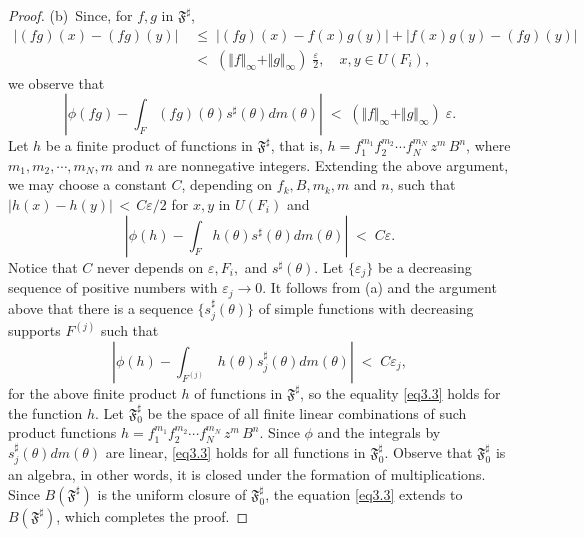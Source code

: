 \documentclass[12pt]{amsart}
\theoremstyle{plain}
\numberwithin{equation}{section}
\begin{document}
\begin{proof}
\medskip
\noindent
{\rm(b)}\, Since, for $f, g$ in $\mathfrak{F}^\sharp$,
\begin{align*}
\left \vert (fg)(x) - (fg)(y) \right \vert
\;&\le\;\left \vert (fg)(x) - f(x)g(y) \right \vert +
\left \vert f(x)g(y) - (fg)(y) \right \vert \\
\;&<\; (\Vert f \Vert_\infty+\Vert g \Vert_\infty )\;\frac{\varepsilon}{2},
\quad x,y \in U(F_i),
\end{align*}
we observe that
\begin{equation*}
\left \vert \phi(fg) -
\int_F (fg)(\theta)s^\sharp(\theta) dm(\theta) \right \vert
\;<\; (\Vert f \Vert_\infty+\Vert g \Vert_\infty )\;\varepsilon.
\end{equation*}
Let $h$ be a finite product of functions in $\mathfrak{F}^\sharp$,
that is, $h = f_1^{m_1} f_2^{m_2} \cdots f_N^{m_N}\, z^m \, B^n$,
where $m_1, m_2, \cdots, m_N, m$ and $n$ are nonnegative integers.
Extending the above argument, we may choose a constant $C$, depending
on $f_k, B, m_k, m$ and $n$, such that $\vert h(x)-h(y)\vert\,<\,C\varepsilon/2$
for $x,y$ in $U(F_i)$ and
\begin{equation*}
\left \vert \phi(h) - \int_F h(\theta)s^\sharp(\theta) dm(\theta) \right \vert
\;<\; C \varepsilon.
\end{equation*}
Notice that $C$ never depends on $\varepsilon, F_i,$ and $s^\sharp(\theta)$.
Let $\{\varepsilon_j\}$ be a decreasing sequence of positive numbers
with $\varepsilon_j \to 0$.
It follows from {\rm(a)} and the argument above
that there is a sequence $\{s^\sharp_j(\theta)\}$ of simple functions
with decreasing supports $F^{(j)}$ such that
\begin{equation*}
\left \vert \phi(h) - \int_{F^{(j)}} \,
h(\theta)s^\sharp_j(\theta) dm(\theta) \right \vert
\;<\; C\varepsilon_j,
\end{equation*}
for the above finite product $h$ of functions in $\mathfrak{F}^\sharp$,
so the equality \eqref{eq3.3} holds for the function $h$.
Let $\mathfrak{F}_0^\sharp$ be the space of all finite linear
combinations of such product functions
$h = f_1^{m_1} f_2^{m_2} \cdots f_N^{m_N}\, z^m \, B^n$. Since $\phi$ and
the integrals by $s^\sharp_j(\theta) dm(\theta)$ are linear, \eqref{eq3.3}
holds for all functions in $\mathfrak{F}_0^\sharp$.
Observe that $\mathfrak{F}_0^\sharp$ is an algebra, in other words,
it is closed under the formation of multiplications.
Since $B(\mathfrak{F}^\sharp)$ is the uniform closure of
$\mathfrak{F}_0^\sharp$, the equation \eqref{eq3.3} extends to
$B(\mathfrak{F}^\sharp)$, which completes the proof.
\end{proof}
\end{document}
